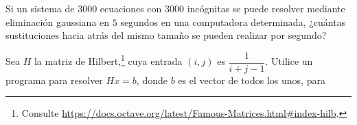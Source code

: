 \begin{questions}
    \question

    Si un sistema de $3000$ ecuaciones con $3000$ incógnitas se puede
    resolver mediante eliminación gaussiana en $5$ segundos en una
    computadora determinada, ¿cuántas sustituciones hacia atrás del
    mismo tamaño se pueden realizar por segundo?

    \question

    Sea $H$ la matriz de Hilbert,\footnote{Consulte \url{https://docs.octave.org/latest/Famous-Matrices.html\#index-hilb}.}
    cuya entrada $\left(i,j\right)$ es $\dfrac{1}{i+j-1}$.
    Utilice un programa para resolver $Hx=b$, donde $b$ es el vector
    de todos los unos, para
    \begin{multicols}{4}
    \end{multicols}
\end{questions}

